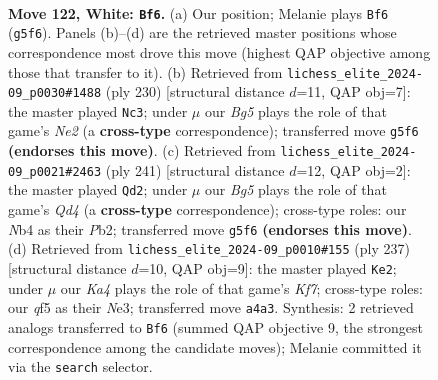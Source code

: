\documentclass[11pt]{article}
\begin{document}
\clearpage

\begin{figure}[p]\centering
\begin{subfigure}{0.46\textwidth}\centering
\resizebox{\linewidth}{!}{%
\newchessgame
\chessboard[
  setfen={8/2k5/8/5qB1/KN6/8/8/8 w - - 12 122},
  showmover=false,
  pgfstyle=straightmove, color=movearrow, markmove={g5-f6}
]}
\caption{}
\end{subfigure}\hfill
\begin{subfigure}{0.46\textwidth}\centering
\resizebox{\linewidth}{!}{%
\newchessgame
\chessboard[
  setfen={8/8/8/2k1q3/8/3K4/4N3/8 w - - 8 116},
  showmover=false,
  pgfstyle=straightmove, color=movearrow, markmove={e2-c3}
]}
\caption{}
\end{subfigure}
\\[4pt]
\begin{subfigure}{0.46\textwidth}\centering
\resizebox{\linewidth}{!}{%
\newchessgame
\chessboard[
  setfen={8/7K/8/3q4/8/8/1pk2Q2/8 b - - 43 121},
  showmover=false,
  pgfstyle=straightmove, color=movearrow, markmove={d5-d2}
]}
\caption{}
\end{subfigure}\hfill
\begin{subfigure}{0.46\textwidth}\centering
\resizebox{\linewidth}{!}{%
\newchessgame
\chessboard[
  setfen={8/8/8/3B2K1/8/4n3/5k2/8 b - - 95 119},
  showmover=false,
  pgfstyle=straightmove, color=movearrow, markmove={f2-e2}
]}
\caption{}
\end{subfigure}
\caption{\textbf{Move 122, White: \texttt{Bf6}.} (a) Our position; Melanie plays \texttt{Bf6} (\texttt{g5f6}). Panels (b)--(d) are the retrieved master positions whose correspondence most drove this move (highest QAP objective among those that transfer to it). (b) Retrieved from \texttt{lichess\_elite\_2024-09\_p0030\#1488} (ply 230) [structural distance $d$=11, QAP obj=7]: the master played \texttt{Nc3}; under $\mu$ our \emph{Bg5} plays the role of that game's \emph{Ne2} (a \textbf{cross-type} correspondence); transferred move \texttt{g5f6} \textbf{(endorses this move)}. (c) Retrieved from \texttt{lichess\_elite\_2024-09\_p0021\#2463} (ply 241) [structural distance $d$=12, QAP obj=2]: the master played \texttt{Qd2}; under $\mu$ our \emph{Bg5} plays the role of that game's \emph{Qd4} (a \textbf{cross-type} correspondence); cross-type roles: our \emph{N}b4 as their \emph{P}b2; transferred move \texttt{g5f6} \textbf{(endorses this move)}. (d) Retrieved from \texttt{lichess\_elite\_2024-09\_p0010\#155} (ply 237) [structural distance $d$=10, QAP obj=9]: the master played \texttt{Ke2}; under $\mu$ our \emph{Ka4} plays the role of that game's \emph{Kf7}; cross-type roles: our \emph{q}f5 as their \emph{N}e3; transferred move \texttt{a4a3}. Synthesis: 2 retrieved analogs transferred to \texttt{Bf6} (summed QAP objective 9, the strongest correspondence among the candidate moves); Melanie committed it via the \texttt{search} selector.}
\label{fig:thought-m242}
\end{figure}
\end{document}

